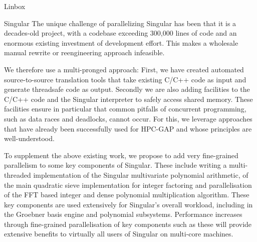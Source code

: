 \begin{Workpackage}{\thewpno}
\begin{task}{Linbox}
\end{task}

\begin{task}{Singular}
  \label{task:hpc_singular}
The unique challenge of parallelizing Singular has been that it is a decades-old project, with a codebase exceeding 300,000 lines of code and an enormous existing investment of development effort. This makes a wholesale manual rewrite or reengineering approach infeasible.

We therefore use a multi-pronged approach: First, we have created automated source-to-source translation tools that take existing C/C++ code as input and generate threadsafe code as output. Secondly we are also adding facilities to the C/C++ code and the Singular interpreter to safely access shared memory. These facilities ensure in particular that common pitfalls of concurrent programming, such as data races and deadlocks, cannot occur. For this, we leverage approaches that have already been successfully used for HPC-GAP and whose principles are well-understood.

To supplement the above existing work, we propose to add very fine-grained parallelism to some key components of Singular. These include writing a multi-threaded implementation of the Singular multivariate polynomial arithmetic, of the main quadratic sieve implementation for integer factoring and parallelisation of the FFT based integer and dense polynomial multiplication algorithm. These key components are used extensively for Singular's overall workload, including in the Groebner basis engine and polynomial subsystems. Performance increases through fine-grained parallelisation of key components such as these will provide extensive benefits to virtually all users of Singular on multi-core machines.
  
\begin{WPDeliverables}
\end{WPDeliverables}
\end{task}


\end{Workpackage}
